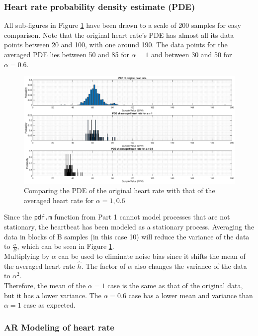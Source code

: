 \subsubsection{Heart rate probability density estimate (PDE)}

All sub-figures in Figure \ref{fig:heartrate_avg} have been drawn to a scale of 200 samples for easy comparison. Note that the original heart rate's PDE has almost all its data points between 20 and 100, with one around 190. The data points for the averaged PDE lies between 50 and 85 for $\alpha=1$ and between 30 and 50 for $\alpha=0.6$.

\begin{figure}[h!]
\centering
\includegraphics[width = \textwidth]{heartrate_avg}
\caption{Comparing the PDE of the original heart rate with that of the averaged heart rate for $\alpha=1,0.6$}
\label{fig:heartrate_avg}
\end{figure}

Since the \texttt{pdf.m} function from Part 1 cannot model processes that are not stationary, the heartbeat has been modeled as a stationary process. Averaging the data in blocks of B samples (in this case 10) will reduce the variance of the data to $\frac{\sigma}{B}$, which can be seen in Figure \ref{fig:heartrate_avg}.\\

Multiplying by $\alpha$ can be used to eliminate noise bias since it shifts the mean of the averaged heart rate $\hat{h}$. The factor of $\alpha$ also changes the variance of the data to $\alpha^2$.\\

Therefore, the mean of the $\alpha=1$ case is the same as that of the original data, but it has a lower variance. The $\alpha=0.6$ case has a lower mean and variance than $\alpha=1$ case as expected.

\subsubsection{AR Modeling of heart rate}

